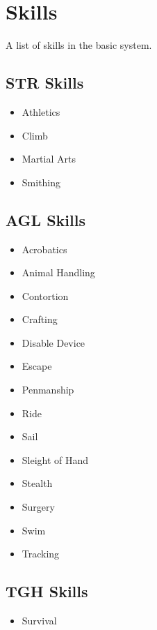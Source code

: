 \documentclass[]{article}
\date{}
\providecommand{\tightlist}{%
  \setlength{\itemsep}{0pt}\setlength{\parskip}{0pt}}
\begin{document}
\section{Skills}\label{skills}

A list of skills in the basic system.

\subsection{STR Skills}\label{str-skills}

\begin{itemize}
\tightlist
\item
  Athletics
\item
  Climb
\item
  Martial Arts
\item
  Smithing
\end{itemize}

\subsection{AGL Skills}\label{agl-skills}

\begin{itemize}
\tightlist
\item
  Acrobatics
\item
  Animal Handling
\item
  Contortion
\item
  Crafting
\item
  Disable Device
\item
  Escape
\item
  Penmanship
\item
  Ride
\item
  Sail
\item
  Sleight of Hand
\item
  Stealth
\item
  Surgery
\item
  Swim
\item
  Tracking
\end{itemize}

\subsection{TGH Skills}\label{tgh-skills}

\begin{itemize}
\tightlist
\item
  Survival
\end{itemize}
\end{document}
